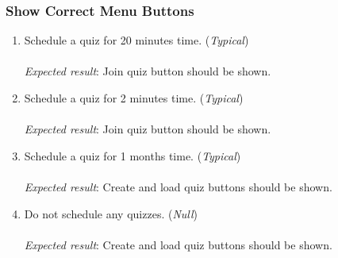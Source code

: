 \subsubsection{Show Correct Menu Buttons} %
\label{ssub:give_appropriate_access_to_quiz}
\begin{enumerate}[leftmargin=*]
\item Schedule a quiz for 20 minutes time. (\textit{Typical})\\\\
\textit{Expected result}: Join quiz button should be shown.\\

\item Schedule a quiz for 2 minutes time. (\textit{Typical})\\\\
\textit{Expected result}: Join quiz button should be shown.\\

\item Schedule a quiz for 1 months time. (\textit{Typical})\\\\
\textit{Expected result}: Create and load quiz buttons should be shown.\\

\item Do not schedule any quizzes. (\textit{Null})\\\\
\textit{Expected result}: Create and load quiz buttons should be shown.
\end{enumerate}
